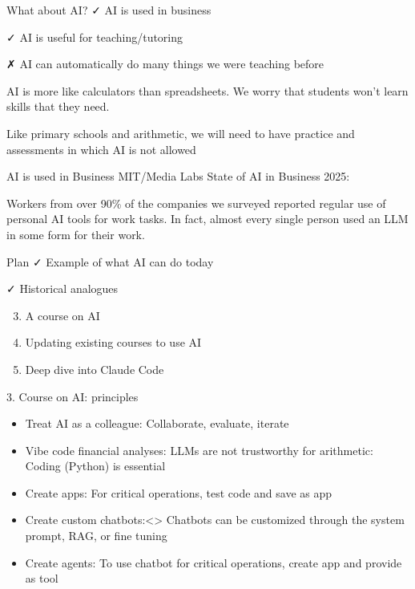 \documentclass[
  ignorenonframetext,
]{beamer}
\providecommand{\tightlist}{%
  \setlength{\itemsep}{0pt}\setlength{\parskip}{0pt}}\usepackage{longtable,booktabs,array}
\begin{document}
\begin{frame}{What about AI?}
\label{what-about-ai}
✓ AI is used in business

✓ AI is useful for teaching/tutoring

✗ AI can automatically do many things we were teaching before

AI is more like calculators than spreadsheets. We worry that students
won't learn skills that they need.

Like primary schools and arithmetic, we will need to have practice and
assessments in which AI is not allowed
\end{frame}

\begin{frame}{AI is used in Business}
\label{ai-is-used-in-business}
MIT/Media Labs State of AI in Business 2025:

Workers from over 90\% of the companies we surveyed reported regular use
of personal AI tools for work tasks. In fact, almost every single person
used an LLM in some form for their work.
\end{frame}

\begin{frame}{Plan}
\label{plan-1}
✓ Example of what AI can do today

✓ Historical analogues

\begin{enumerate}
\setcounter{enumi}{2}
\item
  A course on AI
\item
  Updating existing courses to use AI
\item
  Deep dive into Claude Code
\end{enumerate}
\end{frame}

\begin{frame}{3. Course on AI: principles}
\label{course-on-ai-principles}
\begin{itemize}
\tightlist
\item
  {Treat AI as a colleague:} Collaborate, evaluate, iterate
\item
  {Vibe code financial analyses: LLMs are not trustworthy for
  arithmetic:} Coding (Python) is essential
\item
  {Create apps:} For critical operations, test code and save as app
\item
  Create custom chatbots:\textless{}\span\textgreater{} Chatbots can be
  customized through the system prompt, RAG, or fine tuning
\item
  {Create agents:} To use chatbot for critical operations, create app
  and provide as tool
\end{itemize}
\end{frame}
\end{document}
